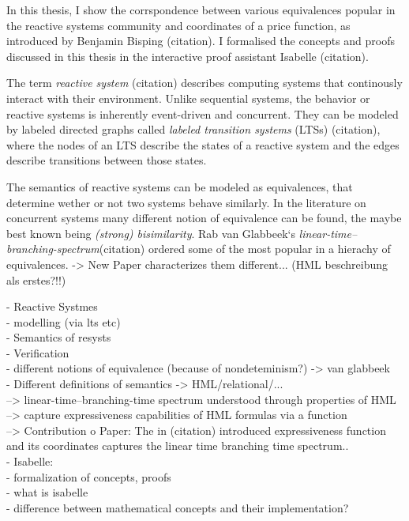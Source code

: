 %
\begin{isabellebody}%
%
%
\isadelimtheory
%
\endisadelimtheory
%
\isatagtheory
%
\endisatagtheory
{\isafoldtheory}%
%
\isadelimtheory
%
\endisadelimtheory
%
\isadelimdocument
%
\endisadelimdocument
%
\isatagdocument
%
\isamarkuptrue%
%
\endisatagdocument
{\isafolddocument}%
%
\isadelimdocument
%
\endisadelimdocument
%
\begin{isamarkuptext}%
In this thesis, I show the corrspondence between various equivalences popular in the reactive
systems community and coordinates of a price function, as introduced by Benjamin Bisping (citation).
I formalised the concepts and proofs discussed in this thesis in the interactive proof assistant Isabelle (citation).

The term \emph{reactive system} (citation) describes computing systems that continously interact with their environment. Unlike sequential systems, 
the behavior or reactive systems is inherently event-driven and concurrent. They can be modeled by labeled directed graphs called \emph{labeled transition systems} (LTSs) (citation),
where the nodes of an LTS describe the states of a reactive system and the edges describe transitions between those states.

The semantics of reactive systems can be modeled as equivalences, that determine wether or not two systems behave similarly.
In the literature on concurrent systems many different notion of equivalence can be found, the maybe best known being \emph{(strong) bisimilarity}.
Rab van Glabbeek`s \emph{linear-time--branching-spectrum}(citation) ordered some of the most popular in a hierachy of equivalences.
-> New Paper characterizes them different... (HML beschreibung als erstes?!!)


- Reactive Systmes \\
  - modelling (via lts etc) \\
  - Semantics of resysts \\
    - Verification \\
    - different notions of equivalence (because of nondeteminism?) -> van glabbeek \\
    - Different definitions of semantics -> HML/relational/... \\
 --> linear-time--branching-time spectrum understood through properties of HML \\
  --> capture expressiveness capabilities of HML formulas via a function \\
--> Contribution o Paper: The in (citation) introduced expressiveness function 
and its coordinates captures the linear time branching time spectrum.. \\
- Isabelle:\\
  - formalization of concepts, proofs \\
  - what is isabelle \\
  - difference between mathematical concepts and their implementation? \\%
\end{isamarkuptext}\isamarkuptrue%
%
\isadelimtheory
%
\endisadelimtheory
%
\isatagtheory
%
\endisatagtheory
{\isafoldtheory}%
%
\isadelimtheory
%
\endisadelimtheory
%
\end{isabellebody}%
